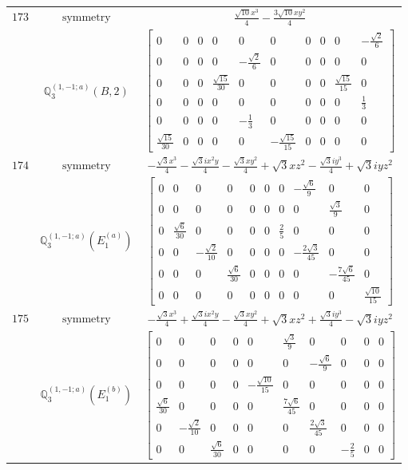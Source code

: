 \documentclass[fleqn,8pt,landscape]{jsarticle}
\begin{document}
\begin{longtable}{ccc}
$ 173 $ & $ \text{symmetry} $ & $ \frac{\sqrt{10} x^{3}}{4} - \frac{3 \sqrt{10} x y^{2}}{4} $ \\
$  $ & $ \mathbb{Q}_{3}^{(1,-1;a)}(B,2) $ & $ \begin{bmatrix} 0 & 0 & 0 & 0 & 0 & 0 & 0 & 0 & 0 & - \frac{\sqrt{2}}{6} \\ 0 & 0 & 0 & 0 & - \frac{\sqrt{2}}{6} & 0 & 0 & 0 & 0 & 0 \\ 0 & 0 & 0 & \frac{\sqrt{15}}{30} & 0 & 0 & 0 & 0 & \frac{\sqrt{15}}{15} & 0 \\ 0 & 0 & 0 & 0 & 0 & 0 & 0 & 0 & 0 & \frac{1}{3} \\ 0 & 0 & 0 & 0 & - \frac{1}{3} & 0 & 0 & 0 & 0 & 0 \\ \frac{\sqrt{15}}{30} & 0 & 0 & 0 & 0 & - \frac{\sqrt{15}}{15} & 0 & 0 & 0 & 0 \end{bmatrix} $ \\ \hline
$ 174 $ & $ \text{symmetry} $ & $ - \frac{\sqrt{3} x^{3}}{4} - \frac{\sqrt{3} i x^{2} y}{4} - \frac{\sqrt{3} x y^{2}}{4} + \sqrt{3} x z^{2} - \frac{\sqrt{3} i y^{3}}{4} + \sqrt{3} i y z^{2} $ \\
$  $ & $ \mathbb{Q}_{3}^{(1,-1;a)}(E_{1}^{(a)}) $ & $ \begin{bmatrix} 0 & 0 & 0 & 0 & 0 & 0 & 0 & - \frac{\sqrt{6}}{9} & 0 & 0 \\ 0 & 0 & 0 & 0 & 0 & 0 & 0 & 0 & \frac{\sqrt{3}}{9} & 0 \\ 0 & \frac{\sqrt{6}}{30} & 0 & 0 & 0 & 0 & \frac{2}{5} & 0 & 0 & 0 \\ 0 & 0 & - \frac{\sqrt{2}}{10} & 0 & 0 & 0 & 0 & - \frac{2 \sqrt{3}}{45} & 0 & 0 \\ 0 & 0 & 0 & \frac{\sqrt{6}}{30} & 0 & 0 & 0 & 0 & - \frac{7 \sqrt{6}}{45} & 0 \\ 0 & 0 & 0 & 0 & 0 & 0 & 0 & 0 & 0 & \frac{\sqrt{10}}{15} \end{bmatrix} $ \\ \hline
$ 175 $ & $ \text{symmetry} $ & $ - \frac{\sqrt{3} x^{3}}{4} + \frac{\sqrt{3} i x^{2} y}{4} - \frac{\sqrt{3} x y^{2}}{4} + \sqrt{3} x z^{2} + \frac{\sqrt{3} i y^{3}}{4} - \sqrt{3} i y z^{2} $ \\
$  $ & $ \mathbb{Q}_{3}^{(1,-1;a)}(E_{1}^{(b)}) $ & $ \begin{bmatrix} 0 & 0 & 0 & 0 & 0 & \frac{\sqrt{3}}{9} & 0 & 0 & 0 & 0 \\ 0 & 0 & 0 & 0 & 0 & 0 & - \frac{\sqrt{6}}{9} & 0 & 0 & 0 \\ 0 & 0 & 0 & 0 & - \frac{\sqrt{10}}{15} & 0 & 0 & 0 & 0 & 0 \\ \frac{\sqrt{6}}{30} & 0 & 0 & 0 & 0 & \frac{7 \sqrt{6}}{45} & 0 & 0 & 0 & 0 \\ 0 & - \frac{\sqrt{2}}{10} & 0 & 0 & 0 & 0 & \frac{2 \sqrt{3}}{45} & 0 & 0 & 0 \\ 0 & 0 & \frac{\sqrt{6}}{30} & 0 & 0 & 0 & 0 & - \frac{2}{5} & 0 & 0 \end{bmatrix} $ \\ \hline

\end{longtable}
\end{document}
